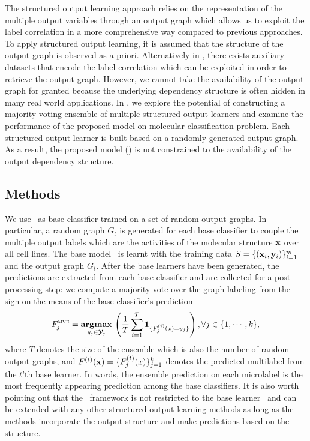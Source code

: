 {%
The structured output learning approach relies on the representation of the multiple output variables through an output graph which allows us to exploit the label correlation in a more comprehensive way compared to previous approaches.
To apply structured output learning, it is assumed that the structure of the output graph is observed as a-priori.
Alternatively in , there exists auxiliary datasets that encode the label correlation which can be exploited in order to retrieve the output graph.
However, we cannot take the availability of the output graph for granted because the underlying dependency structure is often hidden in many real world applications.
In , we explore the potential of constructing a majority voting ensemble of multiple structured output learners and examine the performance of the proposed model on molecular classification problem.
Each structured output learner is built based on a randomly generated output graph.
As a result, the proposed model (\mve) is not constrained to the availability of the output dependency structure.



%
%
\subsection{Methods}

We use \mmcrf\ as base classifier trained on a set of random output graphs.
In particular, a random graph $G_t$ is generated for each base classifier to couple the multiple output labels which are the activities of the molecular structure $\mathbf {x}$ over all cell lines.
The base model \mmcrf\ is learnt with the training data $S=\{(\mathbf {x}_i,\mathbf {y}_i)\}_{i=1}^{m}$ and the output graph $G_t$.
After the base learners have been generated, the predictions are extracted from each base classifier and are collected for a post-processing step: we compute a majority vote over the graph labeling from the sign on the means of the base classifier's prediction
\begin{align*}
	F_j^{\text{{\sc mve}}}=\underset{y_j\in\mathcal{Y}_j}{\textbf{argmax}}\,\left(\frac{1}{T}\sum_{i=1}^{T}\mathbf{1}_{\{F_j^{(t)}(x)=y_j\}}\right), \forall j\in\{1,\cdots,k\},
\end{align*}
where $T$ denotes the size of the ensemble which is also the number of random output graphs, and $F^{(t)}(\mathbf {x})=\{F^{(t)}_j(x)\}_{j=1}^{k}$ denotes the predicted multilabel from the $t$'th base learner.
In words, the ensemble prediction on each microlabel is the most frequently appearing prediction among the base classifiers.
It is also worth pointing out that the \mve\ framework is not restricted to the base learner \mmcrf\ and can be extended with any other structured output learning methods as long as the methods incorporate the output structure and make predictions based on the structure.

}
